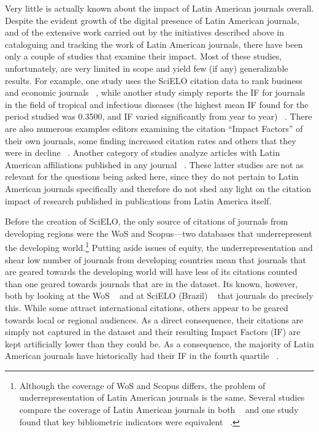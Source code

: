 Very little is actually known about the impact of Latin American journals overall. Despite the evident growth of the digital presence of Latin American journals, and of the extensive work carried out by the initiatives described above in cataloguing and tracking the work of Latin American journals, there have been only a couple of studies that examine their impact. Most of these studies, unfortunately, are very limited in scope and yield few (if any) generalizable results. For example, one study uses the SciELO citation data to rank business and economic journals ~\citep{Alexander2012}, while another study simply reports the IF for journals in the field of tropical and infectious diseases (the highest mean IF found for the period studied was 0.3500, and IF varied significantly from year to year) ~\citep{Rodriguez-Morales2009}. There are also numerous examples editors examining the citation ``Impact Factors'' of their own journals, some finding increased citation rates and others that they were in decline ~\citep{Pereira2006,Pinto2007,Huamani2009}. Another category of studies analyze articles with Latin American affiliations published in any journal ~\citep{Monge-Najera2012,Lemarchand2011,Holmgren:2004ij}. These latter studies are not as relevant for the questions being asked here, since they do not pertain to Latin American journals specifically and therefore do not shed any light on the citation impact of research published in publications from Latin America itself.

Before the creation of SciELO, the only source of citations of journals from developing regions were the WoS and Scopus—two databases that underrepresent the developing world.\footnote{Although the coverage of WoS and Scopus differs, the problem of underrepresentation of Latin American journals is the same. Several studies compare the coverage of Latin American journals in both ~\citep{Rodrigues2014,Miguel2011c} and one study found that key bibliometric indicators were equivalent ~\citep{Santa2010}.} Putting aside issues of equity, the underrepresentation and shear low number of journals from developing countries mean that journals that are geared towards the developing world will have less of its citations counted than one geared towards journals that are in the dataset. Its known, however, both by looking at the WoS ~\citep{Collazo-Reyes2008,Collazo-Reyes2013} and at SciELO (Brazil) ~\citep{Meneghini2006} that journals do precisely this. While some attract international citations, others appear to be geared towards local or regional audiences. As a direct consequence, their citations are simply not captured in the dataset and their resulting Impact Factors (IF) are kept artificially lower than they could be. As a consequence, the majority of Latin American journals have historically had their IF in the fourth quartile ~\citep{Luna-Morales2007,Packer2007}.

